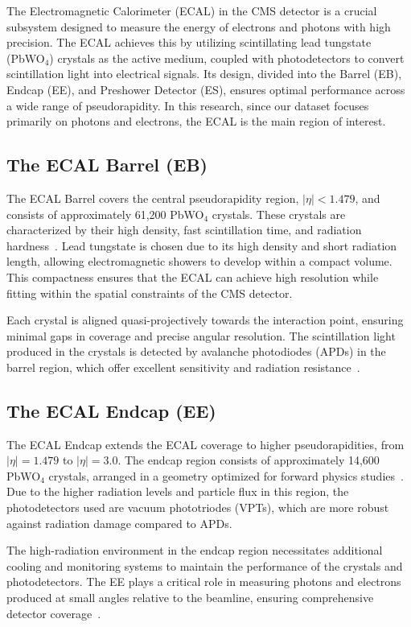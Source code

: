 The Electromagnetic Calorimeter (ECAL) in the CMS detector is a crucial subsystem designed to measure the energy of electrons and photons with high precision. The ECAL achieves this by utilizing scintillating lead tungstate (PbWO$_4$) crystals as the active medium, coupled with photodetectors to convert scintillation light into electrical signals. Its design, divided into the Barrel (EB), Endcap (EE), and Preshower Detector (ES), ensures optimal performance across a wide range of pseudorapidity. In this research, since our dataset focuses primarily on photons and electrons, the ECAL is the main region of interest.

\subsection{The ECAL Barrel (EB)}
The ECAL Barrel covers the central pseudorapidity region, $|\eta| < 1.479$, and consists of approximately 61,200 PbWO$_4$ crystals. These crystals are characterized by their high density, fast scintillation time, and radiation hardness~\cite{ecal_tdr}. Lead tungstate is chosen due to its high density and short radiation length, allowing electromagnetic showers to develop within a compact volume. This compactness ensures that the ECAL can achieve high resolution while fitting within the spatial constraints of the CMS detector.

Each crystal is aligned quasi-projectively towards the interaction point, ensuring minimal gaps in coverage and precise angular resolution. The scintillation light produced in the crystals is detected by avalanche photodiodes (APDs) in the barrel region, which offer excellent sensitivity and radiation resistance~\cite{ecal_tdr}.

\subsection{The ECAL Endcap (EE)}
The ECAL Endcap extends the ECAL coverage to higher pseudorapidities, from $|\eta| = 1.479$ to $|\eta| = 3.0$. The endcap region consists of approximately 14,600 PbWO$_4$ crystals, arranged in a geometry optimized for forward physics studies~\cite{ecal_tdr}. Due to the higher radiation levels and particle flux in this region, the photodetectors used are vacuum phototriodes (VPTs), which are more robust against radiation damage compared to APDs.

The high-radiation environment in the endcap region necessitates additional cooling and monitoring systems to maintain the performance of the crystals and photodetectors. The EE plays a critical role in measuring photons and electrons produced at small angles relative to the beamline, ensuring comprehensive detector coverage~\cite{ecal_tdr}.

